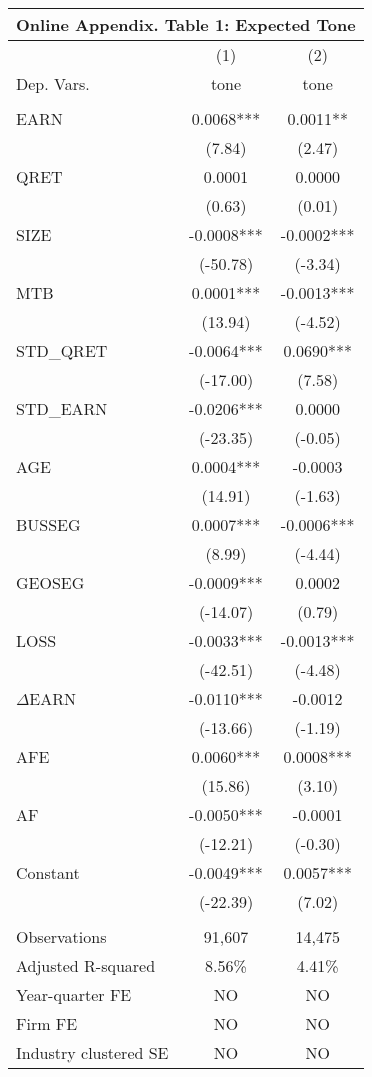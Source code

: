 \begin{table}[htbp] \label{oat1}
  \centering
    \begin{tabular}{lcc}
    \multicolumn{3}{c}{\textbf{Online Appendix. Table 1: Expected Tone}} \\
    \midrule
    \midrule
      & (1) & (2) \\
    Dep. Vars. & tone & tone \\
    \midrule
      &   &  \\
    EARN & 0.0068*** & 0.0011** \\
      & (7.84) & (2.47) \\
    QRET & 0.0001 & 0.0000 \\
      & (0.63) & (0.01) \\
    SIZE &-0.0008*** &-0.0002*** \\
      & (-50.78) & (-3.34) \\
    MTB &0.0001*** &-0.0013*** \\
      & (13.94) & (-4.52) \\
    STD\_QRET & -0.0064*** & 0.0690*** \\
      & (-17.00) & (7.58) \\
    STD\_EARN & -0.0206*** & 0.0000 \\
      & (-23.35) & (-0.05) \\
    AGE & 0.0004*** & -0.0003 \\
      & (14.91) & (-1.63) \\
    BUSSEG & 0.0007*** & -0.0006***\\
      & (8.99) & (-4.44) \\
    GEOSEG & -0.0009*** & 0.0002 \\
      & (-14.07) & (0.79) \\
    LOSS &-0.0033*** &-0.0013*** \\
      & (-42.51) & (-4.48) \\
    $\Delta$EARN & -0.0110*** & -0.0012 \\
      & (-13.66) & (-1.19) \\
    AFE & 0.0060*** & 0.0008*** \\
      & (15.86) & (3.10) \\
    AF & -0.0050*** & -0.0001 \\
      & (-12.21) & (-0.30) \\
    Constant & -0.0049*** & 0.0057*** \\
      & (-22.39) & (7.02) \\
      &   &  \\
    Observations & 91,607 & 14,475 \\
    Adjusted R-squared & 8.56\% & 4.41\% \\
    Year-quarter FE & NO & NO \\
    Firm FE & NO & NO \\
    Industry clustered SE & NO & NO \\
    \bottomrule
    \bottomrule
    \end{tabular}%
\end{table}%
